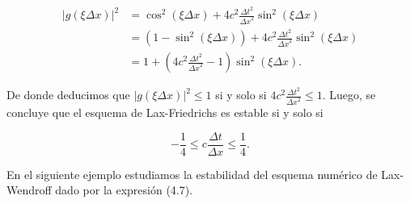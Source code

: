 \begin{example}
  \begin{align*}
    {\left|g\left(\xi\Delta x\right)\right|}^{2} & =
    \cos^{2}
    \left(\xi\Delta x\right)+
    4c^{2}
    \frac{{\Delta t}^{2}}{{\Delta x}^{2}}
    \sin^{2}
    \left(\xi\Delta x\right)                         \\
                                                 & =
    \left(
    1-
    \sin^{2}
    \left(\xi\Delta x\right)
    \right)+
    4c^{2}
    \frac{{\Delta t}^{2}}{{\Delta x}^{2}}
    \sin^{2}\left(\xi\Delta x\right)                 \\
                                                 & =
    1+
    \left(
    4c^{2}
    \frac{{\Delta t}^{2}}{{\Delta x}^{2}}-
    1
    \right)
    \sin^{2}\left(\xi\Delta x\right).
  \end{align*}

  De donde deducimos que
  \begin{math}
    {\left|
      g
      \left(
      \xi\Delta x
      \right)
      \right|}^{2}\leq
    1
  \end{math}
  si y solo si
  \begin{math}
    4c^{2}
    \frac{{\Delta t}^{2}}{{\Delta x}^{2}}\leq
    1
  \end{math}.
  Luego, se concluye que el esquema de Lax-Friedrichs es estable si
  y solo si

  \begin{equation*}
    -\frac{1}{4}\leq
    c\frac{\Delta t}{\Delta x}\leq
    \frac{1}{4}.
  \end{equation*}
\end{example}

En el siguiente ejemplo estudiamos la estabilidad del esquema
numérico de Lax-Wendroff dado por la expresión (4.7).

